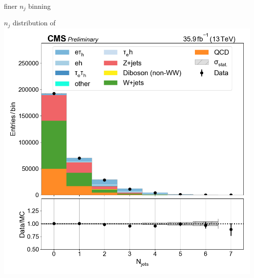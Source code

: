 \begin{frame}{}
    \begin{columns}
        \begin{tcolorbox}[colframe=OliveGreen,colback=white]{finer $n_j$ binning}
            \begin{center}
            \color{OliveGreen}
            \smaller \smaller
            $n_j$ distribution of \cet\\
            \includegraphics[width=\textwidth]{chapters/Analysis/sectionPlots/figures/data_mc_overlays/etau_2016_inclusive_linear_jet_n_jets.png}
            \end{center}
        \end{tcolorbox}
        

\end{columns}
\end{frame}
